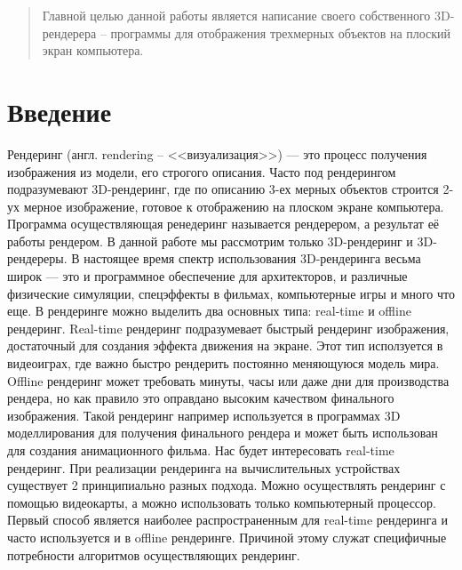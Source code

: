 \documentclass{article}
\begin{document}
\makeTitlePage

\tableofcontents

\begin{abstract}
    Главной целью данной работы является написание своего 
    собственного 3D-рендерера -- программы для отображения трехмерных объектов на плоский 
    экран компьютера.
\end{abstract}


\section{Введение}

Рендеринг (англ. rendering -- <<визуализация>>) --- это процесс 
получения изображения из модели, его строгого описания. 
Часто под рендерингом подразумевают 3D-рендеринг, где по 
описанию 3-ех мерных объектов строится 2-ух мерное изображение, 
готовое к отображению на плоском экране компьютера. Программа 
осуществляющая ренедеринг называется рендерером, а результат её работы 
рендером. В данной работе мы рассмотрим только 3D-рендеринг и 
3D-рендереры. В настоящее время спектр использования 3D-рендеринга весьма 
широк --- это и программное обеспечение для архитекторов, и 
различные физические симуляции, спецэффекты в фильмах, компьютерные 
игры и много что еще. В рендеринге можно выделить два основных 
типа: real-time и offline рендеринг. Real-time рендеринг подразумевает 
быстрый рендеринг изображения, достаточный для создания эффекта движения на 
экране. Этот тип исползуется в видеоиграх, где важно быстро 
рендерить постоянно меняющуюся модель мира. Offline рендеринг 
может требовать минуты, часы или даже дни для производства рендера, 
но как правило это оправдано высоким качеством финального изображения. 
Такой рендеринг например используется в программах 3D моделлирования
для получения финального рендера и может быть использован для 
создания анимационного фильма. Нас будет интересовать 
real-time рендеринг. При реализации рендеринга на вычислительных 
устройствах существует 2 принципиально разных подхода. Можно 
осуществлять рендеринг с помощью видеокарты, а можно использовать 
только компьютерный процессор. Первый способ является наиболее 
распространенным для real-time рендеринга и часто используется и в offline рендеринге.
Причиной этому служат специфичные потребности алгоритмов осуществляющих рендеринг.
\end{document}

